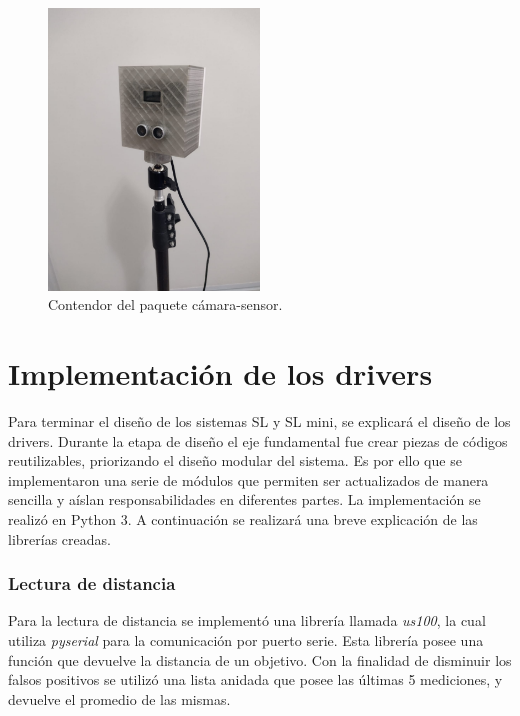 \begin{figure}[bth]
    \centering
    \includegraphics[width=0.5\textwidth]{imgs/contenedor-real.jpeg}
    \caption{Contendor del paquete cámara-sensor.}
    \label{fig:contenedor-camara-real}
\end{figure}

\section{Implementación de los drivers}

Para terminar el diseño de los sistemas SL y SL mini, se explicará el diseño de los drivers. Durante la etapa de diseño el eje fundamental fue crear piezas de códigos reutilizables, priorizando el diseño modular del sistema.
Es por ello que se implementaron una serie de módulos que permiten ser actualizados de manera sencilla y aíslan responsabilidades en diferentes partes. La implementación se realizó en Python 3. A continuación se realizará una breve explicación de las librerías creadas.


\subsubsection*{Lectura de distancia}

Para la lectura de distancia se implementó una librería llamada \textit{us100}, la cual utiliza \textit{pyserial}  \cite{noauthor_documentacion_nodate-1} para la comunicación por puerto serie.
Esta librería posee una función que devuelve la distancia de un objetivo. Con la finalidad de disminuir los falsos positivos se utilizó una lista anidada que posee las últimas 5 mediciones, y devuelve el promedio de las mismas.

